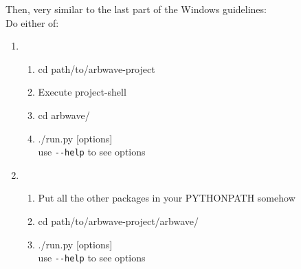 Then, very similar to the last part of the Windows guidelines: \\
Do either of:
\begin{enumerate}
  \item
    \begin{enumerate}
      \item cd path/to/arbwave-project
      \item Execute project-shell
      \item cd arbwave/
      \item ./run.py [options]\\
        use \verb|--help| to see options
    \end{enumerate}
  \item
    \begin{enumerate}
      \item Put all the other packages in your PYTHONPATH somehow
      \item cd path/to/arbwave-project/arbwave/
      \item ./run.py [options]\\
        use \verb|--help| to see options
    \end{enumerate}
\end{enumerate}
